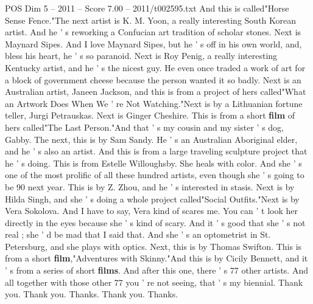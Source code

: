 \begin{textsample}{POS Dim 5 – 2011 – Score 7.00 – 2011/t002595.txt}
And this is called"Horse Sense Fence."The next artist is K.
M.
Yoon, a really interesting South Korean artist.
And he ' s reworking a Confucian art tradition of scholar stones.
Next is Maynard Sipes.
And I love Maynard Sipes, but he ' s off in his own world, and, bless his heart, he ' s so paranoid.
Next is Roy Penig, a really interesting Kentucky artist, and he ' s the nicest guy.
He even once traded a work of art for a block of government cheese because the person wanted it so badly.
Next is an Australian artist, Janeen Jackson, and this is from a project of hers called"What an Artwork Does When We ' re Not Watching."Next is by a Lithuanian fortune teller, Jurgi Petrauskas.
Next is Ginger Cheshire.
This is from a short \textbf{film} of hers called"The Last Person."And that ' s my cousin and my sister ' s dog, Gabby.
The next, this is by Sam Sandy.
He ' s an Australian Aboriginal elder, and he ' s also an artist.
And this is from a large traveling sculpture project that he ' s doing.
This is from Estelle Willoughsby.
She heals with color.
And she ' s one of the most prolific of all these hundred artists, even though she ' s going to be 90 next year.
This is by Z.
Zhou, and he ' s interested in stasis.
Next is by Hilda Singh, and she ' s doing a whole project called"Social Outfits."Next is by Vera Sokolova.
And I have to say, Vera kind of scares me.
You can ' t look her directly in the eyes because she ' s kind of scary.
And it ' s good that she ' s not real ; she ' d be mad that I said that.
And she ' s an optometrist in St.
Petersburg, and she plays with optics.
Next, this is by Thomas Swifton.
This is from a short \textbf{film},"Adventures with Skinny."And this is by Cicily Bennett, and it ' s from a series of short \textbf{films}.
And after this one, there ' s 77 other artists.
And all together with those other 77 you ' re not seeing, that ' s my biennial.
Thank you.
Thank you.
Thanks.
Thank you.
Thanks.

\end{textsample}
